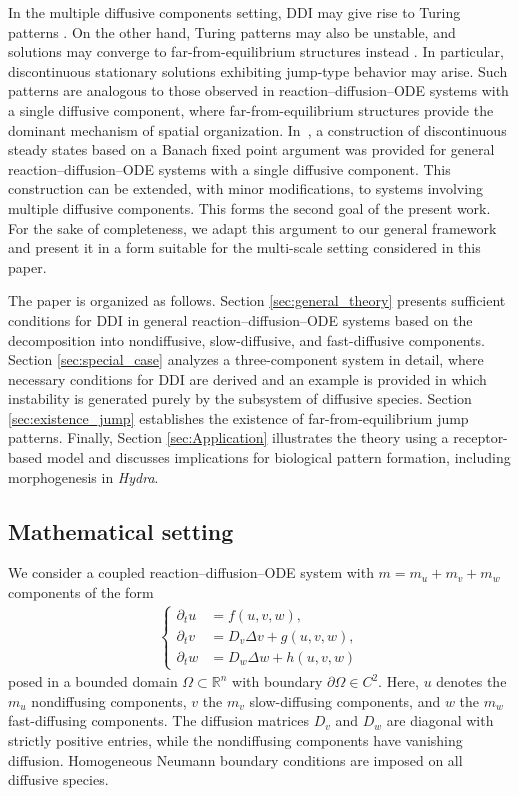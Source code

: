 \documentclass[12pt, a4paper]{amsart}
\numberwithin{equation}{section}
\newcommand{\RR}{\mathbb{R}}
\newcommand{\un}{u}
\newcommand{\us}{v}
\newcommand{\uf}{w}
\newcommand{\Ds}{D_v}
\newcommand{\Df}{D_w}
\newcommand{\mn}{m_{u}}  %
\newcommand{\ms}{m_{v}}  %
\newcommand{\mfa}{m_{w}} %
\newcommand{\fn}{f}
\newcommand{\fs}{g}
\newcommand{\ffa}{h}
\begin{document}
In the multiple diffusive components setting, DDI may give rise to Turing patterns \cite{marasco2014vegetation,Lopez2025,Smith}. On the other hand, Turing patterns may also be unstable, and solutions may converge to far-from-equilibrium structures instead \cite{Marciniak06}. In particular, discontinuous stationary solutions exhibiting jump-type behavior may arise. Such patterns are analogous to those observed in reaction--diffusion--ODE systems with a single diffusive component, where far-from-equilibrium structures provide the dominant mechanism of spatial organization. In~\cite{Cygan2023}, a construction of discontinuous steady states based on a Banach fixed point argument was provided for general reaction--diffusion--ODE systems with a single diffusive component. This construction can be extended, with minor modifications, to systems involving multiple diffusive components. This forms the second goal of the present work. For the sake of completeness, we adapt this argument to our general framework and present it in a form suitable for the multi-scale setting considered in this paper.

The paper is organized as follows. Section \ref{sec:general_theory} presents sufficient conditions for DDI in general reaction--diffusion--ODE systems based on the decomposition into nondiffusive, slow-diffusive, and fast-diffusive components. Section \ref{sec:special_case} analyzes a three-component system in detail, where necessary conditions for DDI are derived and an example is provided in which instability is generated purely by the subsystem of diffusive species. Section \ref{sec:existence_jump} establishes the existence of far-from-equilibrium jump patterns. Finally, Section \ref{sec:Application} illustrates the theory using a receptor-based model and discusses implications for biological pattern formation, including morphogenesis in \emph{Hydra}.

\subsection{Mathematical setting}\label{sec:setting}
We consider a coupled reaction--diffusion--ODE system with $m = \mn + \ms + \mfa$ components of the form
\begin{align}\label{eq:full_system}
    \left\{
    \begin{aligned}
        \partial_t \un &= \fn(\un,\us,\uf),\\
        \partial_t \us &= \Ds \Delta \us + \fs(\un,\us,\uf),\\
        \partial_t \uf &= \Df \Delta \uf + \ffa(\un,\us,\uf)
    \end{aligned}
    \right.
\end{align}
posed in a bounded domain $\Omega\subset\RR^n$ with boundary $\partial\Omega\in C^2$.
Here, $\un$ denotes the $\mn$ nondiffusing components, $\us$ the $\ms$ slow-diffusing components, and $\uf$ the $\mfa$ fast-diffusing components. The diffusion matrices $\Ds$ and $\Df$ are diagonal with strictly positive entries, while the nondiffusing components have vanishing diffusion. Homogeneous Neumann boundary conditions are imposed on all diffusive species.
\end{document}

